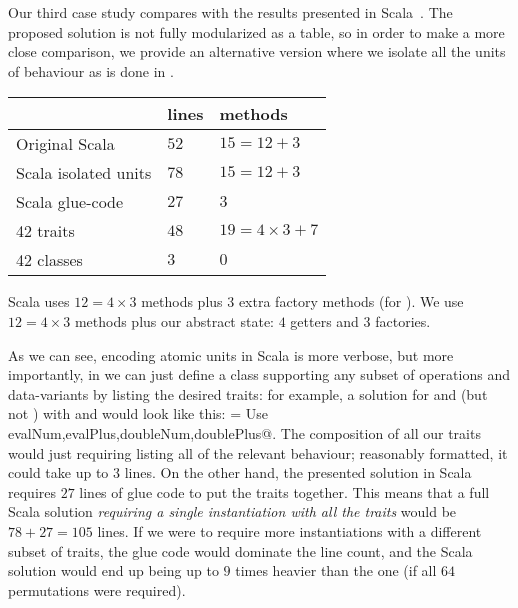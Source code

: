 Our third case study compares with the results presented
in Scala~\cite{Zenger-Odersky2005}.
The proposed solution is not fully modularized as a table,
so in order to make a more close comparison, we provide an alternative
version where we isolate all the units of behaviour as is done in \name.

\noindent\begin{minipage}{0.60\textwidth}
\begin{tabular}{l |l |l}
&                              lines  &   methods\\
\hline
Original Scala          & $52$     &  $15=12+3$\\
Scala  isolated units   & $78$    &  $15=12+3$\\
Scala  glue-code        & $27$   &     $3$\\
42 traits               & $48$
 &    $19=4\times3+7$\\
42 classes              &   $3$    &     $0$\\
\end{tabular}
\end{minipage}
\begin{minipage}{0.40\textwidth}
Scala uses $12=4\times3$ methods plus $3$ extra factory methods (for \Q@double@).
We use $12=4\times3$ methods plus our abstract state: 
$4$ getters and $3$ factories.
\end{minipage}

\noindent As we can see, encoding atomic units in Scala is
more verbose,
but more importantly,
in \name we can just define a class supporting any subset of operations
and data-variants by listing the desired traits:
for example, a solution for \Q@Num@ and \Q@Plus@ (but not \Q@Neg@)
with \Q@eval@ and \Q@double@ would look like this:
\Q@Example= Use evalNum,evalPlus,doubleNum,doublePlus@.
The composition of all our traits would just requiring listing all
of the relevant behaviour;
reasonably formatted, it could take up to $3$ lines.
On the other hand, the presented solution in Scala requires
$27$ lines of glue code to put the traits together.
This means that a full Scala solution \emph{requiring a single instantiation with all the traits} would be $78+27=105$ lines.
If we were to require more instantiations with a different subset of traits, the glue code would dominate the line count,
and the Scala solution would end up being up to $9$ times heavier than the
\name one (if all $64$ permutations were required).

